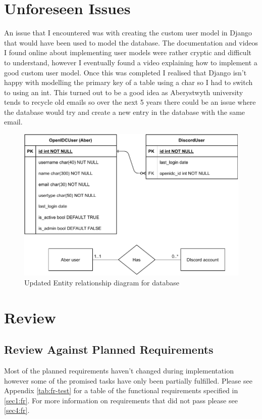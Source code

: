 \section{Unforeseen Issues}\label{sec3:unforeseen}
An issue that I encountered was with creating the custom user model in Django that would have been used to model the database. The documentation and videos I found online about implementing user models were rather cryptic and difficult to understand, however I eventually found a video explaining how to implement a good custom user model. Once this was completed I realised that Django isn't happy with modelling the primary key of a table using a char so I had to switch to using an int. This turned out to be a good idea as Aberystwyth university tends to recycle old emails so over the next 5 years there could be an issue where the database would try and create a new entry in the database with the same email.
\begin{figure}[H]
	\centering
	\includegraphics[width=0.8\linewidth]{Figures/database-er-1}
	\caption{Updated Entity relationship diagram for database}
	\label{fig:database-er-1}
\end{figure}

\section{Review}
\subsection{Review Against Planned Requirements}\label{sec3:pr}
Most of the planned requirements haven't changed during implementation however some of the promised tasks have only been partially fulfilled. Please see Appendix \ref{tab:fr-test} for a table of the functional requirements specified in \ref{sec1:fr}. For more information on requirements that did not pass please see \ref{sec4:fr}.

